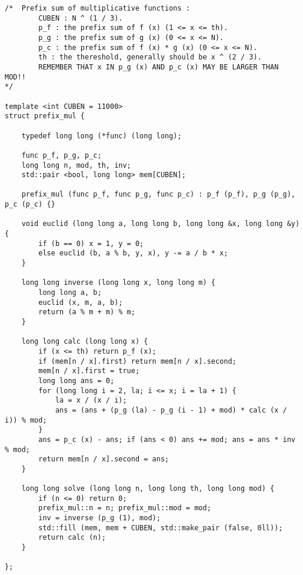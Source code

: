 \begin{lstlisting}
/*	Prefix sum of multiplicative functions :
		CUBEN : N ^ (1 / 3).
		p_f : the prefix sum of f (x) (1 <= x <= th).
		p_g : the prefix sum of g (x) (0 <= x <= N).
		p_c : the prefix sum of f (x) * g (x) (0 <= x <= N).
		th : the thereshold, generally should be x ^ (2 / 3).
		REMEMBER THAT x IN p_g (x) AND p_c (x) MAY BE LARGER THAN MOD!!
*/

template <int CUBEN = 11000>
struct prefix_mul {

	typedef long long (*func) (long long);

	func p_f, p_g, p_c;
	long long n, mod, th, inv;
	std::pair <bool, long long> mem[CUBEN];

	prefix_mul (func p_f, func p_g, func p_c) : p_f (p_f), p_g (p_g), p_c (p_c) {}

	void euclid (long long a, long long b, long long &x, long long &y) {
		if (b == 0) x = 1, y = 0;
		else euclid (b, a % b, y, x), y -= a / b * x;
	}

	long long inverse (long long x, long long m) {
		long long a, b;
		euclid (x, m, a, b);
		return (a % m + m) % m;
	}

	long long calc (long long x) {
		if (x <= th) return p_f (x);
		if (mem[n / x].first) return mem[n / x].second;
		mem[n / x].first = true;
		long long ans = 0;
		for (long long i = 2, la; i <= x; i = la + 1) {
			la = x / (x / i);
			ans = (ans + (p_g (la) - p_g (i - 1) + mod) * calc (x / i)) % mod;
		}
		ans = p_c (x) - ans; if (ans < 0) ans += mod; ans = ans * inv % mod;
		return mem[n / x].second = ans;
	}

	long long solve (long long n, long long th, long long mod) {
		if (n <= 0) return 0;
		prefix_mul::n = n; prefix_mul::mod = mod;
		inv = inverse (p_g (1), mod);
		std::fill (mem, mem + CUBEN, std::make_pair (false, 0ll));
		return calc (n); 
	}

};
\end{lstlisting}

